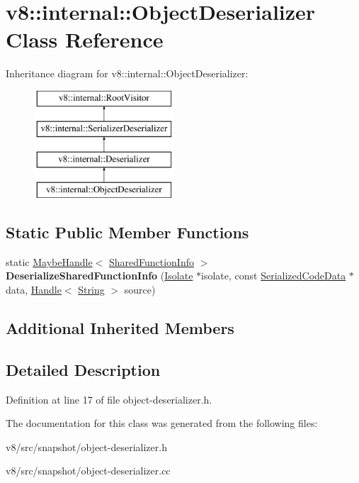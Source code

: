 \hypertarget{classv8_1_1internal_1_1ObjectDeserializer}{}\section{v8\+:\+:internal\+:\+:Object\+Deserializer Class Reference}
\label{classv8_1_1internal_1_1ObjectDeserializer}
Inheritance diagram for v8\+:\+:internal\+:\+:Object\+Deserializer\+:\begin{figure}[H]
\begin{center}
\leavevmode
\includegraphics[height=4.000000cm]{classv8_1_1internal_1_1ObjectDeserializer}
\end{center}
\end{figure}
\subsection*{Static Public Member Functions}
\begin{DoxyCompactItemize}
\item 
\mbox{\label{classv8_1_1internal_1_1ObjectDeserializer_a9e65309a45aaf8ad00cbab56eef7695c}} 
static \mbox{\hyperlink{classv8_1_1internal_1_1MaybeHandle}{Maybe\+Handle}}$<$ \mbox{\hyperlink{classv8_1_1internal_1_1SharedFunctionInfo}{Shared\+Function\+Info}} $>$ {\bfseries Deserialize\+Shared\+Function\+Info} (\mbox{\hyperlink{classv8_1_1internal_1_1Isolate}{Isolate}} $\ast$isolate, const \mbox{\hyperlink{classv8_1_1internal_1_1SerializedCodeData}{Serialized\+Code\+Data}} $\ast$data, \mbox{\hyperlink{classv8_1_1internal_1_1Handle}{Handle}}$<$ \mbox{\hyperlink{classv8_1_1internal_1_1String}{String}} $>$ source)
\end{DoxyCompactItemize}
\subsection*{Additional Inherited Members}


\subsection{Detailed Description}


Definition at line 17 of file object-\/deserializer.\+h.



The documentation for this class was generated from the following files\+:\begin{DoxyCompactItemize}
\item 
v8/src/snapshot/object-\/deserializer.\+h\item 
v8/src/snapshot/object-\/deserializer.\+cc\end{DoxyCompactItemize}
